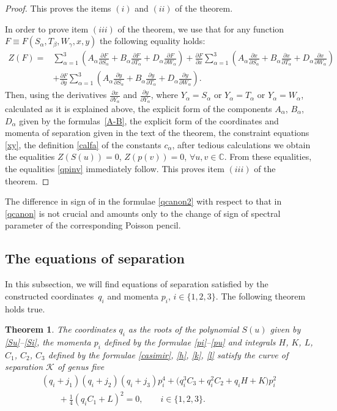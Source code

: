 \documentclass[10pt,a4paper]{amsart}
\def\a{\alpha}
\def\b{\beta}
\def\g{\gamma}
\numberwithin{equation}{section}
\newtheorem{Theorem}{Theorem}[section]
\begin{document}
\begin{proof}
 This proves the items $(i)$ and $(ii)$ of the theorem.


In order to prove item $(iii)$ of the theorem, we use that for any function $F\equiv F(S_{\a}, T_{\b}, W_{\g},\allowbreak x,y)$ the following equality holds:
\begin{align*}
Z(F)={}& \sum\limits_{\a=1}^3\left( A_{\a}\frac{\partial F}{ \partial S_{\a}}+
B_{\a}\frac{\partial F}{ \partial T_{\a}}+ D_{\a}\frac{\partial F}{ \partial W_{\a}}\right) + \frac{\partial F}{ \partial x}\sum\limits_{\a=1}^3\left( A_{\a}\frac{\partial x}{ \partial S_{\a}}+
B_{\a}\frac{\partial x}{ \partial T_{\a}}+ D_{\a}\frac{\partial x}{ \partial W_{\a}}\right)
\\
&+
\frac{\partial F}{ \partial y} \sum\limits_{\a=1}^3\left( A_{\a}\frac{\partial y}{ \partial S_{\a}}+
B_{\a}\frac{\partial y}{ \partial T_{\a}}+ D_{\a}\frac{\partial y}{ \partial W_{\a}}\right).
\end{align*}
Then, using the derivatives $\frac{\partial x}{\partial Y_{ \a}}$ and $\frac{\partial y}{\partial Y_{ \a}}$, where $Y_{\a}=S_{\a}$ or $Y_{\a}=T_{\a}$ or $Y_{\a}=W_{\a}$, calculated as it is explained above, the explicit form of the components $A_{\a}$, $B_{\a}$, $D_{\a}$ given by the formulas~\eqref{A-B}, the explicit form of the coordinates and momenta of separation given in the text of the theorem, the constraint equations \eqref{xy}, the definition \eqref{calfa} of the constants $c_{\a}$, after tedious calculations we obtain the equalities
$
Z(S(u))=0$, $ Z(p(v))=0$, $ \forall u,v \in \mathbb{C}$.
From these equalities, the equalities \eqref{qpinv} immediately follow.
This proves item $(iii)$ of the theorem.
\end{proof}

\begin{Remark}

 The difference in sign of in the formulae \eqref{qcanon2} with respect to that in \eqref{qcanon} is not crucial and amounts only to the change of sign of spectral parameter of the corresponding Poisson pencil.
\end{Remark}
\subsection{The equations of separation}
In this subsection, we will find equations of separation satisfied by the constructed coordinates~$q_i$ and momenta $p_i$, $i\in \{1,2,3\}$.
The following theorem holds true.

\begin{Theorem}\label{sepeq}
The coordinates $q_i$ as the roots of the polynomial $S(u)$ given by \eqref{Su}--\eqref{Si}, the momenta $p_i$ defined by the formulae
\eqref{pi}--\eqref{pu} and integrals $H$, $K$, $L$, $C_1$, $C_2$, $C_3$ defined by the formulae \eqref{casimir}, \eqref{h}, \eqref{k}, \eqref{l}
satisfy the curve of separation $\mathcal{K}$ of genus five
\begin{gather}
(q_i+j_1)(q_i+j_2)(q_i+j_3) p_i^4+\big(q_i^3 C_3+q_i^2 C_2+ q_i H+K \big) p_i^2\nonumber \\
\qquad{}+ \frac{1}{4}(q_i C_1+L)^2=0,\qquad i\in \{1,2,3\}.\label{eqsepi}
\end{gather}
\end{Theorem}
\end{document}
